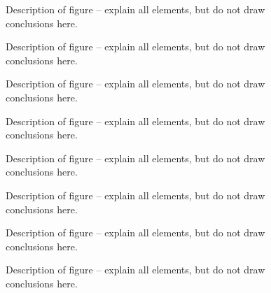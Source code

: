 \documentclass{emulateapj}
\begin{document}
\begin{figure}[t]
\mbox{}
\caption{Description of figure -- explain all elements, but do not
draw conclusions here.}
\label{fig:figure_label}
\end{figure}

\begin{figure}[t]
\mbox{}
\caption{Description of figure -- explain all elements, but do not
draw conclusions here.}
\label{fig:figure_label}
\end{figure}

\begin{figure}[t]
\mbox{}
\caption{Description of figure -- explain all elements, but do not
draw conclusions here.}
\label{fig:figure_label}
\end{figure}

\begin{figure}[t]
\mbox{}
\caption{Description of figure -- explain all elements, but do not
draw conclusions here.}
\label{fig:figure_label}
\end{figure}

\begin{figure}[t]
\mbox{}
\caption{Description of figure -- explain all elements, but do not
draw conclusions here.}
\label{fig:figure_label}
\end{figure}

\begin{figure}[t]
\mbox{}
\caption{Description of figure -- explain all elements, but do not
draw conclusions here.}
\label{fig:figure_label}
\end{figure}

\begin{figure}[t]
\mbox{}
\caption{Description of figure -- explain all elements, but do not
draw conclusions here.}
\label{fig:figure_label}
\end{figure}

\begin{figure}[t]
\mbox{}
\caption{Description of figure -- explain all elements, but do not
draw conclusions here.}
\label{fig:figure_label}
\end{figure}
\end{document}

